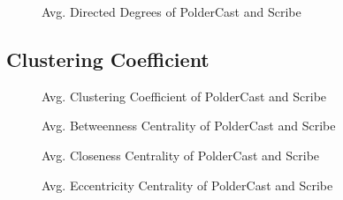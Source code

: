 %     

\begin{figure}[H]
    \centering
    \caption{Avg. Directed Degrees of PolderCast and Scribe}
    \label{fig:eval_directedtdegree}
\end{figure}

\subsection{Clustering Coefficient}
\begin{figure}[H]
    \centering
    
    \caption{Avg. Clustering Coefficient of PolderCast and Scribe}
    \label{fig:eval_cc}
\end{figure}


\begin{figure}[H]
    \centering
    
    \caption{Avg. Betweenness Centrality of PolderCast and Scribe}
    \label{fig:eval_betweenness}
\end{figure}

\begin{figure}[H]
    \centering
    
    \caption{Avg. Closeness Centrality of PolderCast and Scribe}
    \label{fig:eval_closeness}
\end{figure}

\begin{figure}[H]
    \centering
    
    \caption{Avg. Eccentricity Centrality of PolderCast and Scribe}
    \label{fig:eval_eccentricity}
\end{figure}

